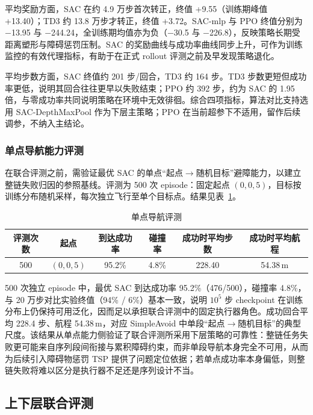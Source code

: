 平均奖励方面，SAC 在约 4.9 万步首次转正，终值 +9.55（训练期峰值 +13.40）；TD3 约 13.8 万步才转正，终值 +3.72。SAC-mlp 与 PPO 终值分别为 $-$13.95 与 $-$244.24，全训练期均值亦为负（$-$30.5 与 $-$226.8），反映策略长期受距离塑形与障碍惩罚压制。SAC 的奖励曲线与成功率曲线同步上升，可作为训练监控的有效代理指标，有助于在正式 rollout 评测之前及早发现策略退化。

平均步数方面，SAC 终值约 201 步/回合，TD3 约 164 步。TD3 步数更短但成功率更低，说明其回合往往更早以失败结束；PPO 约 392 步，约为 SAC 的 1.95 倍，与零成功率共同说明策略在环境中无效徘徊。综合四项指标，算法对比支持选用 SAC-DepthMaxPool 作为下层主策略；PPO 在当前超参下不适用，留作后续调参，不纳入主结论。

\subsubsection{单点导航能力评测}

在联合评测之前，需验证最优 SAC 的单点``起点$\to$随机目标''避障能力，以建立整链失败归因的参照基线。评测为 500 次 episode：固定起点 $(0,0,5)$，目标按训练分布随机采样，每次独立飞行至单个目标点。结果见表~\ref{tab:nav-single}。

\begin{table}[htbp]
  \centering
  \caption{单点导航评测}
  \label{tab:nav-single}
  \begin{tabular}{cccccc}
    \toprule
    评测次数 & 起点 & 到达成功率 & 碰撞率 & 成功时平均步数 & 成功时平均航程 \\
    \midrule
    500 & $(0,0,5)$ & 95.2\% & 4.8\% & 228.40 & 54.38\,m \\
    \bottomrule
  \end{tabular}

\end{table}

500 次独立 episode 中，最优 SAC 到达成功率 95.2\%（476/500），碰撞率 4.8\%，与 20 万步对比实验终值（94\% / 6\%）基本一致，说明 $10^5$ 步 checkpoint 在训练分布上仍保持可用泛化，因而足以承担联合评测中的固定执行器角色。成功回合平均 228.4 步、航程 54.38\,m，对应 SimpleAvoid 中单段``起点$\to$随机目标''的典型尺度。该结果从单点能力侧验证了联合评测所采用下层策略的可靠性：整链任务失败更可能来自序列段间衔接与累积障碍约束，而非单段导航本身完全不可用，从而为后续引入障碍物惩罚 TSP 提供了问题定位依据；若单点成功率本身偏低，则整链失败将难以区分是执行器不足还是序列设计不当。

\subsection{上下层联合评测}


